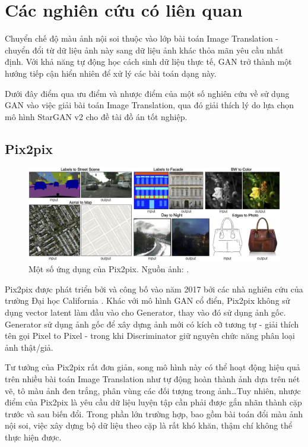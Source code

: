 \documentclass[12pt]{extreport}
\begin{document}
\section{Các nghiên cứu có liên quan}

Chuyển chế độ màu ảnh nội soi thuộc vào lớp bài toán Image Translation - chuyển đổi từ dữ liệu ảnh này sang dữ liệu ảnh khác thỏa mãn yêu cầu nhất định. Với khả năng tự động học cách sinh dữ liệu thực tế, GAN trở thành một hướng tiếp cận hiển nhiên để xử lý các bài toán dạng này.

Dưới đây điểm qua ưu điểm và nhược điểm của một số nghiên cứu về sử dụng GAN vào việc giải bài toán Image Translation, qua đó giải thích lý do lựa chọn mô hình StarGAN v2 cho đề tài đồ án tốt nghiệp.

\subsection{Pix2pix}

\begin{figure}[H]
    \centering
    \includegraphics[width=\textwidth]{figure14}
    \caption{Một số ứng dụng của Pix2pix. Nguồn ảnh: \cite{pix2pix2017}.}
\end{figure}

Pix2pix được phát triển bởi và công bố vào năm 2017 bởi các nhà nghiên cứu của trường Đại học California \cite{pix2pix2017}. Khác với mô hình GAN cổ điển, Pix2pix không sử dụng vector latent làm đầu vào cho Generator, thay vào đó sử dụng ảnh gốc. Generator sử dụng ảnh gốc để xây dựng ảnh mới có kích cỡ tương tự - giải thích tên gọi Pixel to Pixel - trong khi Discriminator giữ nguyên chức năng phân loại ảnh thật/giả.

Tư tưởng của Pix2pix rất đơn giản, song mô hình này có thể hoạt động hiệu quả trên nhiều bài toán Image Translation như tự động hoàn thành ảnh dựa trên nét vẽ, tô màu ảnh đen trắng, phân vùng các đối tượng trong ảnh\dots Tuy nhiên, nhược điểm của Pix2pix là yêu cầu dữ liệu luyện tập cần phải được gắn nhãn thành cặp trước và sau biến đổi. Trong phần lớn trường hợp, bao gồm bài toán đổi màu ảnh nội soi, việc xây dựng bộ dữ liệu theo cặp là rất khó khăn, thậm chí không thể thực hiện được.
\end{document}
